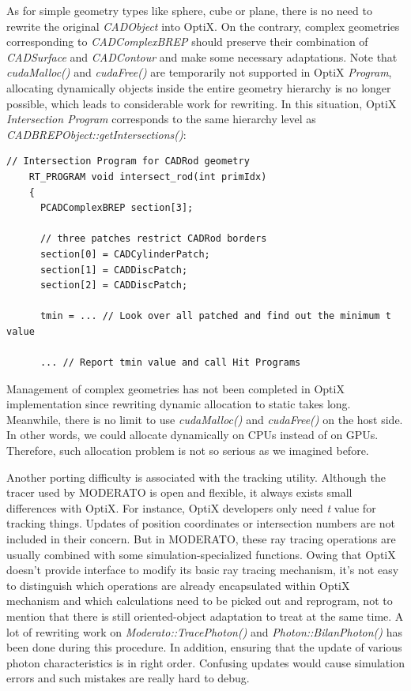 As for simple geometry types like sphere, cube or plane, there is no need to rewrite the original \textit{CADObject} into OptiX. On the contrary, complex geometries corresponding to \textit{CADComplexBREP} should preserve their combination of \textit{CADSurface} and \textit{CADContour} and make some necessary adaptations. Note that \textit{cudaMalloc()} and \textit{cudaFree()} are temporarily not supported in OptiX \textit{Program}, allocating dynamically objects inside the entire geometry hierarchy is no longer possible, which leads to considerable work for rewriting. In this situation, OptiX \textit{Intersection Program} corresponds to the same hierarchy level as \textit{CADBREPObject::getIntersections()}:
\begin{lstlisting}[mathescape]
    // Intersection Program for CADRod geometry
    RT_PROGRAM void intersect_rod(int primIdx)
    {
      PCADComplexBREP section[3];
      
      // three patches restrict CADRod borders
      section[0] = CADCylinderPatch;
      section[1] = CADDiscPatch;
      section[2] = CADDiscPatch;
      
      tmin = ... // Look over all patched and find out the minimum t value
      
      ... // Report tmin value and call Hit Programs
\end{lstlisting}
Management of complex geometries has not been completed in OptiX implementation since rewriting dynamic allocation to static takes long. Meanwhile, there is no limit to use \textit{cudaMalloc()} and \textit{cudaFree()} on the host side. In other words, we could allocate dynamically on CPUs instead of on GPUs. Therefore, such allocation problem is not so serious as we imagined before.

Another porting difficulty is associated with the tracking utility. Although the tracer used by MODERATO is open and flexible, it always exists small differences with OptiX. For instance, OptiX developers only need \textit{t} value for tracking things. Updates of position coordinates or intersection numbers are not included in their concern. But in MODERATO, these ray tracing operations are usually combined with some simulation-specialized functions. Owing that OptiX doesn't provide interface to modify its basic ray tracing mechanism, it's not easy to distinguish which operations are already encapsulated within OptiX mechanism and which calculations need to be picked out and reprogram, not to mention that there is still oriented-object adaptation to treat at the same time. A lot of rewriting work on \textit{Moderato::TracePhoton()} and \textit{Photon::BilanPhoton()} has been done during this procedure. In addition, ensuring that the update of various photon characteristics is in right order. Confusing updates would cause simulation errors and such mistakes are really hard to debug.

